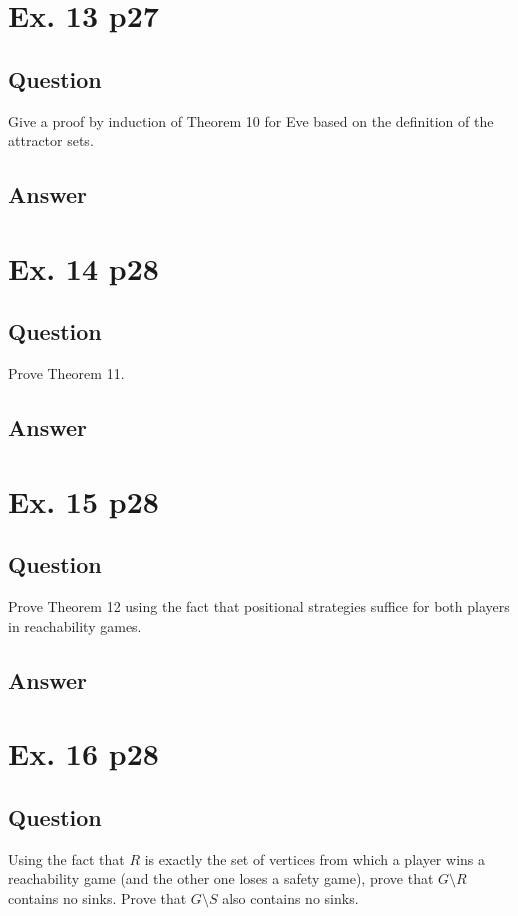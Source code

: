 \documentclass[12pt]{article}
\begin{document}
\section{Ex. 13 p27}
\subsection{Question}
Give a proof by induction of Theorem 10 for Eve based on the definition of the attractor sets.

\subsection{Answer}


\section{Ex. 14 p28}
\subsection{Question}
Prove Theorem 11.

\subsection{Answer}


\section{Ex. 15 p28}
\subsection{Question}
Prove Theorem 12 using the fact that positional strategies suffice for both players in reachability games.

\subsection{Answer}


\section{Ex. 16 p28}
\subsection{Question}
Using the fact that $R$ is exactly the set of vertices from which a player wins a reachability game (and the other one loses a safety game), prove that $G\setminus R$ contains no sinks. Prove that $G\setminus S$ also contains no sinks.
\end{document}
